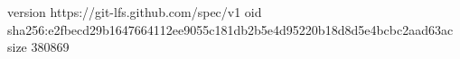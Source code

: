 version https://git-lfs.github.com/spec/v1
oid sha256:e2fbecd29b1647664112ee9055c181db2b5e4d95220b18d8d5e4bcbc2aad63ac
size 380869
